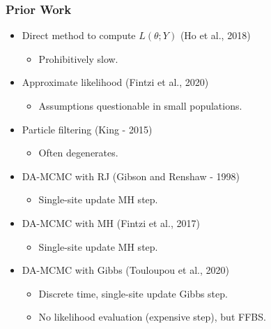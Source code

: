 \documentclass{beamer}
\begin{document}
\begin{frame} \frametitle{Prior Work}
	
	\begin{itemize}
		\item Direct method to compute $L(\theta; Y)$ (Ho et al., 2018)
		\begin{itemize}
			\item Prohibitively slow.
		\end{itemize}
		\item Approximate likelihood (Fintzi et al., 2020)
		\begin{itemize}
			\item Assumptions questionable in small populations.
		\end{itemize}
		\item Particle filtering (King - 2015)
		\begin{itemize}
			\item Often degenerates.
		\end{itemize}
		\item DA-MCMC with RJ (Gibson and Renshaw - 1998)
		\begin{itemize}
			\item Single-site update MH step.
		\end{itemize}
		\item DA-MCMC with MH (Fintzi et al., 2017)
		\begin{itemize}
			\item Single-site update MH step.
		\end{itemize}
		\item DA-MCMC with Gibbs (Touloupou et al., 2020)
		\begin{itemize}
			\item Discrete time, single-site update Gibbs step.
			\item No likelihood evaluation (expensive step), but FFBS.
		\end{itemize}
	\end{itemize}
	
\end{frame}
\end{document}
